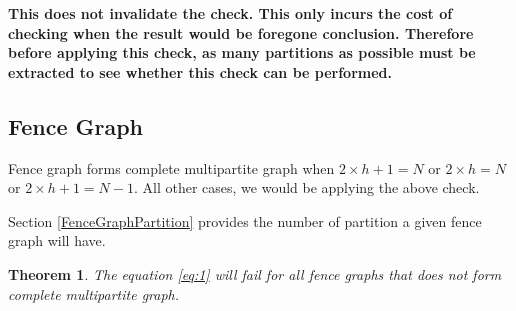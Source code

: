 \documentclass[12pt]{article}
\theoremstyle{plain}
\newtheorem{theorem}{Theorem}[section] %
\theoremstyle{definition}
\begin{document}
\textbf{This does not invalidate the check. This only incurs the cost of checking when the result would be foregone conclusion. Therefore before applying this check, as many partitions as possible must be extracted to see whether this check can be performed.}

\subsection{Fence Graph}

Fence graph forms complete multipartite graph when $2 \times h + 1 = N$ or $2 \times h = N$ or $2 \times h + 1 = N - 1$. All other cases, we would be applying the above check.

Section \ref{FenceGraphPartition} provides the number of partition a given fence graph will have.

\begin{theorem}
 The equation \eqref{eq:1} will fail for all fence graphs that does not form complete multipartite graph.
\end{theorem}
\end{document}
